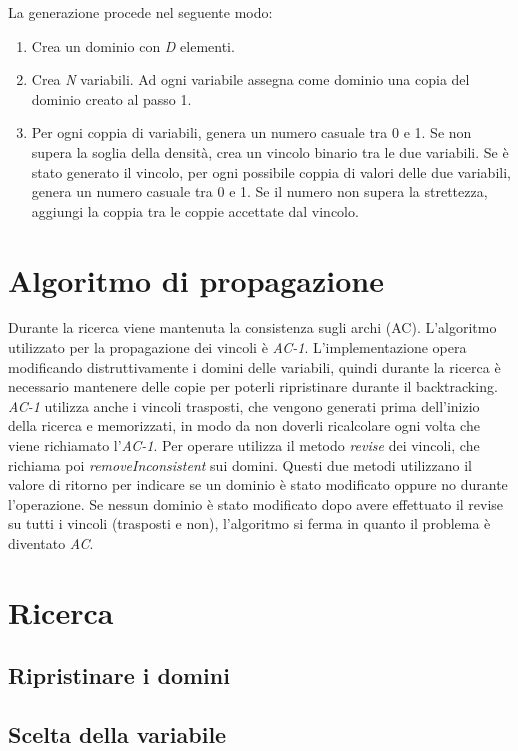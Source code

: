 \documentclass[a4paper,12pt,italian]{article}
\begin{document}
La generazione procede nel seguente modo:
\begin{enumerate}
\item Crea un dominio con \textit{D} elementi.
\item Crea \textit{N} variabili. Ad ogni variabile assegna come
  dominio una copia del dominio creato al passo 1.
\item Per ogni coppia di variabili, genera un numero casuale tra 0 e
  1. Se non supera la soglia della densit\`a, crea un vincolo binario
  tra le due variabili. Se \`e stato generato il vincolo, per ogni
  possibile coppia di valori delle due variabili, genera un numero
  casuale tra 0 e 1. Se il numero non supera la strettezza, aggiungi
  la coppia tra le coppie accettate dal vincolo.
\end{enumerate}

\section{Algoritmo di propagazione}

Durante la ricerca viene mantenuta la consistenza sugli archi
(AC). L'algoritmo utilizzato per la propagazione dei vincoli \`e
\textit{AC-1}. L'implementazione opera modificando distruttivamente i
domini delle variabili, quindi durante la ricerca \`e necessario
mantenere delle copie per poterli ripristinare durante il
backtracking. \textit{AC-1} utilizza anche i vincoli trasposti, che
vengono generati prima dell'inizio della ricerca e memorizzati, in
modo da non doverli ricalcolare ogni volta che viene richiamato l'\textit{AC-1}.
Per operare utilizza il metodo \textit{revise} dei vincoli, che
richiama poi \textit{removeInconsistent} sui domini. Questi due metodi
utilizzano il valore di ritorno per indicare se un dominio \`e stato
modificato oppure no durante l'operazione. Se nessun dominio \`e stato modificato dopo
avere effettuato il revise su tutti i vincoli (trasposti e non),
l'algoritmo si ferma in quanto il problema \`e diventato \textit{AC}.

\section{Ricerca}
\subsection{Ripristinare i domini}
\subsection{Scelta della variabile}
\end{document}
